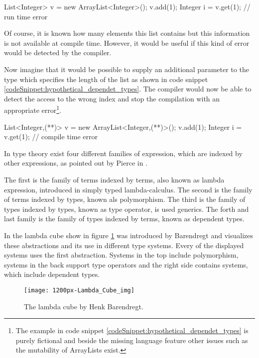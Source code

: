 \begin{codesnippet}[caption={ArrayList index error}, label={codeSnippet:array_index_error}]
List<Integer> v = new ArrayList<Integer>();
v.add(1);
Integer i = v.get(1); // run time error
\end{codesnippet}

Of course, it is known how many elements this list contains but this information is not available at compile time. 
However, it would be useful if this kind of error would be detected by the compiler.

Now imagine that it would be possible to supply an additional parameter to the type which specifies the length of the list as shown in code snippet \ref{codeSnippet:hypothetical_dependet_types}. 
The compiler would now be able to detect the access to the wrong index and stop the compilation with an appropriate error\footnote{The example in code snippet \ref{codeSnippet:hypothetical_dependet_types} is purely fictional and beside the missing language feature other issues such as the mutability of ArrayLists exist.}.

\begin{codesnippet}[escapeinside={(*}{*)}, caption={ArrayList with size parameter}, label={codeSnippet:hypothetical_dependet_types}]
List<Integer,(**)> v = new ArrayList<Integer,(**)>();
v.add(1);
Integer i = v.get(1); // compile time error
\end{codesnippet}

In type theory exist four different families of expression, which are indexed by other expressions, as pointed out by Pierce in \cite{10.5555/1076265}. 

The first is the family of terms indexed by terms, also known as lambda expression, introduced in simply typed lambda-calculus. 
The second is the family of terms indexed by types, known als polymorphism. 
The third is the family of types indexed by types, known as type operator, is used generics. 
The forth and last family is the family of types indexed by terms, known as dependent types.

In the lambda cube show in figure \ref{fig:lambda_cube} was introduced by Barendregt \cite{lambda_cube} and visualizes these abstractions and its use in different type systems. Every of the displayed systems uses the first abstraction. Systems in the top include polymorphism, systems in the back support type operators and the right side contains systems, which include dependent types.
\begin{figure}[h]
\centering
\texttt{[image: 1200px-Lambda\_Cube\_img]}
\caption{The lambda cube by Henk Barendregt.}
\label{fig:lambda_cube}
\end{figure}



